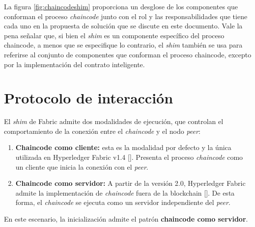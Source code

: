 La figura \ref{fig:chaincodeshim} proporciona un desglose de los componentes que conforman el proceso \textit{chaincode} junto con el rol y las responsabilidades que tiene cada uno en la propuesta de solución que se discute en este documento. Vale la pena señalar que, si bien el \textit{shim} es un componente específico del proceso chaincode, a menos que se especifique lo contrario, el \textit{shim} también se usa para referirse al conjunto de componentes que conforman el proceso chaincode, excepto por la implementación del contrato inteligente.




%

\section{Protocolo de interacción}\label{protocolinteraction}
El \textit{shim} de Fabric admite dos modalidades de ejecución, que controlan el comportamiento de la conexión entre el \textit{chaincode} y el nodo \textit{peer}:

\begin{enumerate}
\item \textbf{Chaincode como cliente:} esta es la modalidad por defecto y la única utilizada en Hyperledger Fabric v1.4 [\cite{hlf-internals}]. Presenta el proceso \textit{chaincode} como un cliente que inicia la conexión con el \textit{peer}.

\item \textbf{Chaincode como servidor:} A partir de la versión 2.0, Hyperledger Fabric admite la implementación de \textit{chaincode} fuera de la blockchain [\cite{hlf-internals}]. De esta forma, el \textit{chaincode} se ejecuta como un servidor independiente del \textit{peer}.
\end{enumerate}

En este escenario, la inicialización admite el patrón \textbf{chaincode como  servidor}.\\[10cm]




